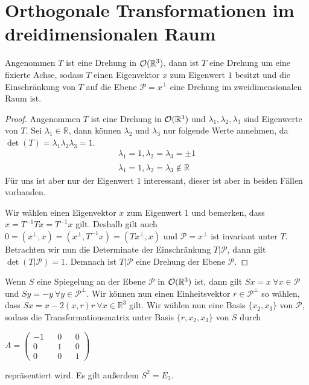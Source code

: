 \section{Orthogonale Transformationen im dreidimensionalen Raum}
\begin{theorem}
 Angenommen $T$ ist eine Drehung in ${\mathcal{O}(\mathbb{R}^3)}$, dann ist $T$ eine Drehung um eine fixierte Achse, sodass $T$ einen Eigenvektor $x$ zum Eigenwert $1$ besitzt und die Einschränkung von $T$ auf die Ebene $\mathcal{P}=x^{\perp}$ eine Drehung im zweidimensionalen Raum ist.
\end{theorem}
\begin{proof}
 Angenommen $T$ ist eine Drehung in ${\mathcal{O}(\mathbb{R}^3)}$ und $\lambda_1,\lambda_2,\lambda_3$ sind Eigenwerte von $T$. Sei $\lambda_1 \in \mathbb{R}$, dann können $\lambda_2$ und $\lambda_3$ nur folgende Werte annehmen, da $\det(T)=\lambda_1\lambda_2\lambda_3=1$.
 \begin{align}
  \lambda_1=1, \lambda_2=\lambda_3=\pm1 \\
  \lambda_1=1, \lambda_2=\overline{\lambda_3}\notin \mathbb{R}
 \end{align}
Für uns ist aber nur der Eigenwert $1$ interessant, dieser ist aber in beiden Fällen vorhanden.

Wir wählen einen Eigenvektor $x$ zum Eigenwert $1$ und bemerken, dass $x=T^{-1}Tx=T^{-1}x$ gilt. Deshalb gilt auch $0=(x^{\perp},x)=(x^{\perp},T^{-1}x)=(Tx^{\perp},x)$ und $\mathcal{P}=x^{\perp}$ ist invariant unter $T$. Betrachten wir nun die Determinate der Einschränkung $T|\mathcal{P}$, dann gilt $\det(T|\mathcal{P})=1$. Demnach ist $T|\mathcal{P}$ eine Drehung der Ebene $\mathcal{P}$.
\end{proof}
\begin{bem}
 Wenn $S$ eine Spiegelung an der Ebene $\mathcal{P}$ in ${\mathcal{O}(\mathbb{R}^3)}$ ist, dann gilt $Sx=x \ \forall x \in \mathcal{P}$ und $Sy=-y \ \forall y \in \mathcal{P}^{\perp}$. Wir können nun einen Einheitsvektor $r \in \mathcal{P}^{\perp}$ so wählen, dass $Sx=x-2(x,r)r \ \forall x\in \mathbb{R}^3$ gilt. Wir wählen nun eine Basis $\{x_2,x_3\}$ von $\mathcal{P}$, sodass die Transformationsmatrix unter Basis $\{r,x_2,x_3\}$ von $S$ durch 
 \begin{center}
  $A= \begin{pmatrix}
        -1 && 0 && 0 \\
        0 && 1 && 0 \\
        0 && 0 && 1 
       \end{pmatrix}$
 \end{center}
repräsentiert wird. Es gilt außerdem $S^2 = E_3$.
\end{bem}
